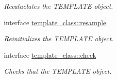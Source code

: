 \begin{DoxyCompactItemize}
\begin{DoxyCompactList}\small\item\em Recaluclates the T\-E\-M\-P\-L\-A\-T\-E object. \end{DoxyCompactList}\item 
interface \hyperlink{interfacetemplate__class_1_1resample}{template\-\_\-class\-::resample}
\begin{DoxyCompactList}\small\item\em Reinitializes the T\-E\-M\-P\-L\-A\-T\-E object. \end{DoxyCompactList}\item 
interface \hyperlink{interfacetemplate__class_1_1check}{template\-\_\-class\-::check}
\begin{DoxyCompactList}\small\item\em Checks that the T\-E\-M\-P\-L\-A\-T\-E object. \end{DoxyCompactList}\end{DoxyCompactItemize}
